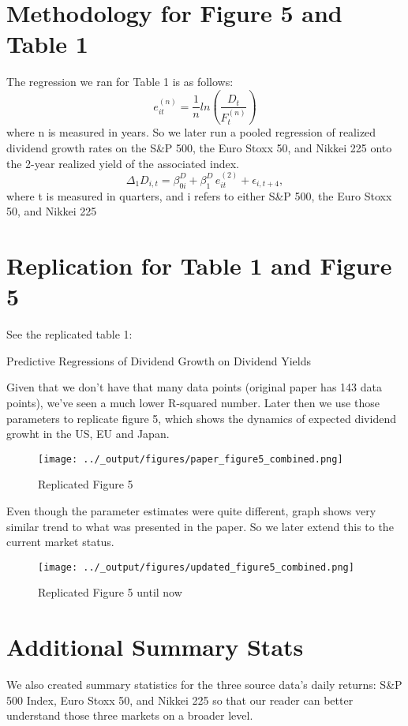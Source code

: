 \documentclass{article}
\begin{document}
\section{Methodology for Figure 5 and Table 1}
The regression we ran for Table 1 is as follows: 
\[
e_{it}^{(n)} = \frac{1}{n}ln(\frac{D_t}{F_t^{(n)}})
\]
where n is measured in years. So we later run a pooled regression of realized dividend growth rates on the S\&P 500, 
the Euro Stoxx 50, and Nikkei 225 onto the 2-year realized yield of the associated index. 
\[
\Delta_1 D_{i,t} 
= \beta_{0i}^D 
+ \beta_{1}^D \, e_{it}^{(2)} 
+ \epsilon_{i,t+4},
\]
where t is measured in quarters, and i refers to either S\&P 500, 
the Euro Stoxx 50, and Nikkei 225
\section{Replication for Table 1 and Figure 5}
See the replicated table 1:
\begin{table}[H]
  \centering
  \caption{Predictive Regressions of Dividend Growth on Dividend Yields}
  
  \label{tab:your_label}
  \end{table}

Given that we don't have that many data points (original paper has 143 data points), 
we've seen a much lower R-squared number. 
Later then we use those parameters to replicate figure 5, which shows the dynamics of expected dividend growht in the US, EU and Japan.
 
\begin{figure}[H]
  \centering
  \texttt{[image: ../\_output/figures/paper\_figure5\_combined.png]} 
  \caption{Replicated Figure 5}
  \label{fig:figure_5}
\end{figure}
Even though the parameter estimates were quite different, graph shows very similar trend to what was presented in the paper.
So we later extend this to the current market status.

\begin{figure}[H]
  \centering
  \texttt{[image: ../\_output/figures/updated\_figure5\_combined.png]}
  \caption{Replicated Figure 5 until now}
  \label{fig:figure_5_current}
\end{figure}

\section{Additional Summary Stats}
We also created summary statistics for the three source data's daily returns: S\&P 500 Index, Euro Stoxx 50, and Nikkei 225 so that
our reader can better understand those three markets on a broader level. 
\end{document}

